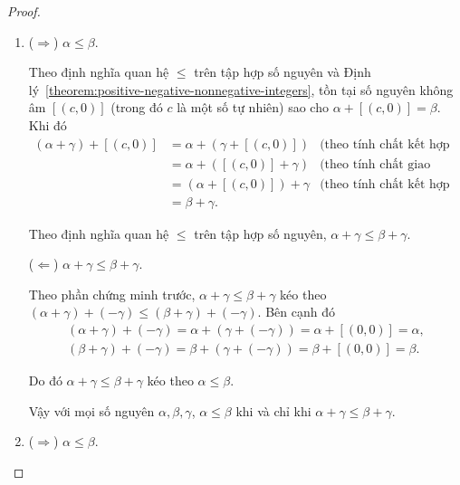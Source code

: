\begin{proof}
	\begin{enumerate}[label={(\roman*)}]
		\item ($\Rightarrow$) $\alpha\leq\beta$.

		      Theo định nghĩa quan hệ $\leq$ trên tập hợp số nguyên và Định lý~\ref{theorem:positive-negative-nonnegative-integers}, tồn tại số nguyên không âm $[(c,0)]$ (trong đó $c$ là một số tự nhiên) sao cho $\alpha + [(c, 0)] = \beta$. Khi đó
		      \begin{align*}
			      (\alpha + \gamma) + [(c, 0)] & = \alpha + (\gamma + [(c, 0)]) & \text{(theo tính chất kết hợp của phép cộng số nguyên)}   \\
			                                   & = \alpha + ([(c, 0)] + \gamma) & \text{(theo tính chất giao hoán của phép cộng số nguyên)} \\
			                                   & = (\alpha + [(c, 0)]) + \gamma & \text{(theo tính chất kết hợp của phép cộng số nguyên)}   \\
			                                   & = \beta + \gamma.
		      \end{align*}

		      Theo định nghĩa quan hệ $\leq$ trên tập hợp số nguyên, $\alpha + \gamma\leq \beta + \gamma$.

		      ($\Leftarrow$) $\alpha + \gamma\leq \beta + \gamma$.

		      Theo phần chứng minh trước, $\alpha + \gamma\leq \beta + \gamma$ kéo theo $(\alpha + \gamma) + (-\gamma)\leq (\beta + \gamma) + (-\gamma)$. Bên cạnh đó
		      \[
			      \begin{split}
				      (\alpha + \gamma) + (-\gamma) = \alpha + (\gamma + (-\gamma)) = \alpha + [(0,0)] = \alpha, \\
				      (\beta + \gamma) + (-\gamma) = \beta + (\gamma + (-\gamma)) = \beta + [(0,0)] = \beta.
			      \end{split}
		      \]

		      Do đó $\alpha + \gamma\leq \beta + \gamma$ kéo theo $\alpha\leq\beta$.

		      Vậy với mọi số nguyên $\alpha, \beta, \gamma$, $\alpha\leq \beta$ khi và chỉ khi $\alpha + \gamma\leq \beta + \gamma$.
		\item ($\Rightarrow$) $\alpha\leq\beta$.


\end{enumerate}
\end{proof}
